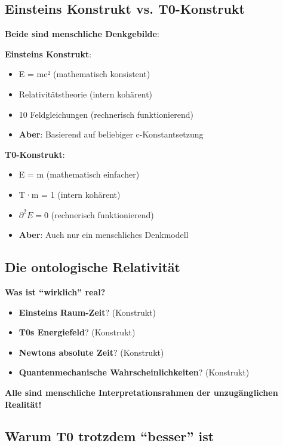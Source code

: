	\subsection{Einsteins Konstrukt vs. T0-Konstrukt}
	
	\textbf{Beide sind menschliche Denkgebilde}:
	
	\textbf{Einsteins Konstrukt}:
	\begin{itemize}
		\item E = mc² (mathematisch konsistent)
		\item Relativitätstheorie (intern kohärent)
		\item 10 Feldgleichungen (rechnerisch funktionierend)
		\item \textbf{Aber}: Basierend auf beliebiger c-Konstantsetzung
	\end{itemize}
	
	\textbf{T0-Konstrukt}:
	\begin{itemize}
		\item E = m (mathematisch einfacher)
		\item T·m = 1 (intern kohärent)
		\item $\partial^2 E = 0$ (rechnerisch funktionierend)
		\item \textbf{Aber}: Auch nur ein menschliches Denkmodell
	\end{itemize}
	
	\subsection{Die ontologische Relativität}
	
	\textbf{Was ist ``wirklich'' real?}
	\begin{itemize}
		\item \textbf{Einsteins Raum-Zeit}? (Konstrukt)
		\item \textbf{T0s Energiefeld}? (Konstrukt)
		\item \textbf{Newtons absolute Zeit}? (Konstrukt)
		\item \textbf{Quantenmechanische Wahrscheinlichkeiten}? (Konstrukt)
	\end{itemize}
	
	\textbf{Alle sind menschliche Interpretationsrahmen der unzugänglichen Realität!}
	
	\subsection{Warum T0 trotzdem ``besser'' ist}
	
